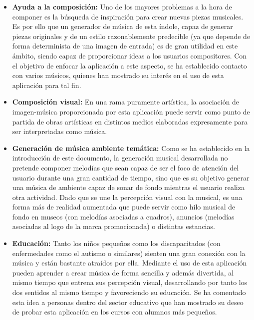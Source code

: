 \begin{itemize} 

\item\textbf{Ayuda a la composición:} Uno de los mayores problemas a la hora de componer es la búsqueda de inspiración para crear nuevas piezas musicales. Es por ello que un generador de música de esta índole, capaz de generar piezas originales y de un estilo razonablemente predecible (ya que depende de forma determinista de una imagen de entrada) es de gran utilidad en  este ámbito, siendo capaz de proporcionar ideas a los usuarios compositores. Con el objetivo de enfocar la aplicación a este aspecto, se ha establecido contacto con varios músicos, quienes han mostrado su interés en el uso de esta aplicación para tal fin.

\item\textbf{Composición visual:} En una rama puramente artística, la asociación de imagen-música proporcionada por esta aplicación puede servir como punto de partida de obras artísticas en distintos medios elaboradas expresamente para ser interpretadas como música.

\item\textbf{Generación de música ambiente temática:} Como se ha establecido en la introducción de este documento, la generación musical desarrollada no pretende componer melodías que sean capaz de ser el foco de atención del usuario durante una gran cantidad de tiempo, sino que es su objetivo generar una música de ambiente capaz de sonar de fondo mientras el usuario realiza otra actividad. Dado que se une la percepción visual con la musical, es una forma más de realidad aumentada que puede servir como hilo musical de fondo en museos (con melodías asociadas a cuadros), anuncios (melodías asociadas al logo de la marca promocionada) o distintas estancias.

\item\textbf{Educación:} Tanto los niños pequeños como los discapacitados (con enfermedades como el autismo o similares) sienten una gran conexión con la música y están bastante atraídos por ella. Mediante el uso de esta aplicación pueden aprender a crear música de forma sencilla y además divertida, al mismo tiempo que entrena sus percepción visual, desarrollando por tanto los dos sentidos al mismo tiempo y favoreciendo su educación. Se ha comentado esta idea a personas dentro del sector educativo que han mostrado su deseo de probar esta aplicación en los cursos con alumnos más pequeños.

\end{itemize}

